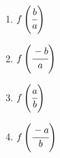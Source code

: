 \begin{multicols}{2}
\begin{enumerate}[label={\arabic*.}]
	\begin{enumerate}[label={\Alph*.}]
	\item \(f\left(\cfrac{b}{a}\right)\)
	\item \(f\left(\cfrac{-b}{a}\right)\)
	\item \(f\left(\cfrac{a}{b}\right)\)
	\item \(f\left(\cfrac{-a}{b}\right)\)
	\end{enumerate}
\end{enumerate}
\end{multicols}